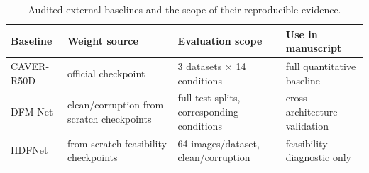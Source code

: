 \begin{table}[t]
\centering
\caption{Audited external baselines and the scope of their reproducible evidence.}
\label{tab:external_scope}
\begin{tabular}{llll}
\toprule
Baseline & Weight source & Evaluation scope & Use in manuscript \\
\midrule
CAVER-R50D & official checkpoint & 3 datasets $\times$ 14 conditions & full quantitative baseline \\
DFM-Net & clean/corruption from-scratch checkpoints & full test splits, corresponding conditions & cross-architecture validation \\
HDFNet & from-scratch feasibility checkpoints & 64 images/dataset, clean/corruption & feasibility diagnostic only \\
\bottomrule
\end{tabular}
\end{table}
